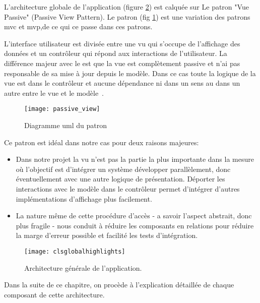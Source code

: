 L'architecture globale de l'application (figure \ref{fig:cls_global})
est calquée sur Le patron "Vue Passive" (Passive View Pattern). Le patron
 (fig \ref{fig:passive_view}) est une variation des
patrons \gls{mvc} et \gls{mvp},de ce qui ce passe dans ces patrons.

L'interface utilisateur est divisée entre une vu qui s'occupe de
l'affichage des données et un contrôleur qui répond aux interactions de
l'utilisateur. La différence majeur avec le  est que la
vue est complètement passive et n'ai pas responsable de sa mise à jour
depuis le modèle. Dans ce cas toute la logique de la vue est dans le
contrôleur et aucune dépendance ni dans un sens au dans un autre entre
le vue et le modèle~\cite{fowler:passive_view}.

\begin{figure}[H]
\center
\texttt{[image: passive\_view]}
\caption{Diagramme \gls{uml} du patron ~\cite{fowler:passive_view}}
\label{fig:passive_view}
\end{figure}

Ce patron est idéal dans notre cas pour deux raisons majeures:

\begin{itemize} 

\item Dans notre projet la vu n'est pas la partie la plus importante
dans la mesure où l'objectif est d'intégrer un système développer
parallèlement, donc éventuellement avec une autre logique de
présentation. Déporter les interactions avec le modèle dans le
contrôleur permet d'intégrer d'autres implémentations d'affichage plus
facilement.

\item La nature même de cette procédure d’accès - a savoir l’aspect
abstrait, donc plus fragile - nous conduit à réduire les composants en
relations pour réduire la marge d'erreur possible et facilité les tests d’intégration.

\end{itemize}

\begin{figure}
\center
\texttt{[image: clsglobalhighlights]}
\caption{Architecture générale de l'application.}
\label{fig:cls_global}
\end{figure}

Dans la suite de ce chapitre, on procède à l'explication détaillée de chaque composant de cette architecture.

